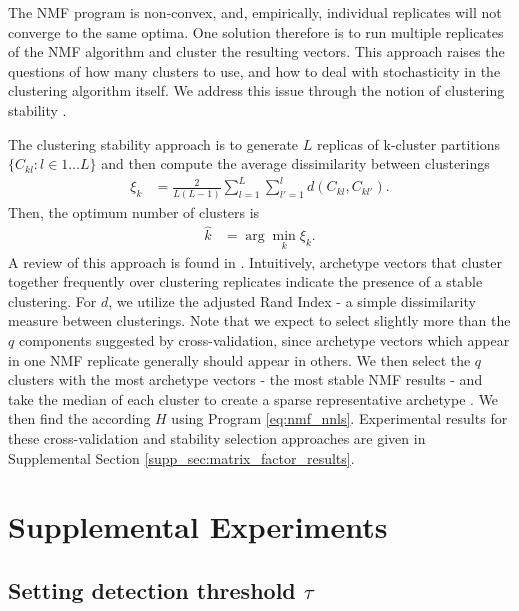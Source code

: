 The NMF program is non-convex, and, empirically, individual replicates will not converge to the same optima.
One solution therefore is to run multiple replicates of the NMF algorithm and cluster the resulting vectors.
This approach raises the questions of how many clusters to use, and how to deal with stochasticity in the clustering algorithm itself.
We address this issue through the notion of clustering stability \citep{Von_Luxburg2010-lu}.

The clustering stability approach is to generate $L$ replicas of k-cluster partitions $\{C_{kl} : l \in 1 \dots L\}$ and then compute the average dissimilarity between clusterings
\begin{align*}
\xi_k &= \frac{2}{L(L - 1)} \sum_{l = 1}^{L} \sum_{l'= 1}^{l}  d(C_{kl}, C_{kl'}).
\end{align*}
Then, the optimum number of clusters is 
\begin{align*}
\hat k &= \arg \min_k \xi_k.
\end{align*}
A review of this approach is found in \citet{Von_Luxburg2010-qe}.
Intuitively, archetype vectors that cluster together frequently over clustering replicates indicate the presence of a stable clustering.
For $d$, we utilize the adjusted Rand Index - a simple dissimilarity measure between clusterings.
Note that we expect to select slightly more than the $q$ components suggested by cross-validation, since archetype vectors which appear in one NMF replicate generally should appear in others.
We then select the $q$ clusters with the most archetype vectors - the most stable NMF results - and take the median of each cluster to create a sparse representative archetype \citet{Wu2016-gg, Kotliar2019-yj}.
We then find the according $H$ using Program \ref{eq:nmf_nnls}.
Experimental results for these cross-validation and stability selection approaches are given in Supplemental Section \ref{supp_sec:matrix_factor_results}.

\newpage

\section{Supplemental Experiments}
\label{supp_sec:exp}

\subsection{Setting detection threshold $\tau$}
\label{supp:exp_lower}

